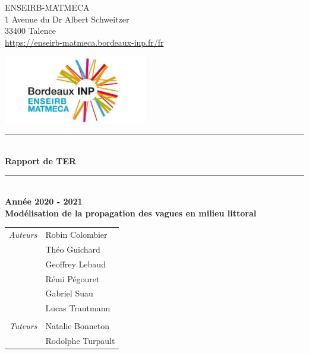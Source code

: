 \documentclass[
a4paper,
11pt,
titlepage,
]{article}
\begin{document}
\thispagestyle{empty}
\begin{titlepage}
	
  \begin{multicols}{2}
    \noindent ENSEIRB-MATMECA\\
    1 Avenue du Dr Albert Schweitzer\\
    33400 Talence\\
    \url{https://enseirb-matmeca.bordeaux-inp.fr/fr}
    \begin{flushright}
      \includegraphics[height=3cm]{logo_enseirb_matmeca.png}
    \end{flushright}
  \end{multicols}
  
  \begin{center}
    \rule{\linewidth}{0.5mm}\\[0.5cm]
    {\Large \textbf{Rapport de TER}}\\[0.3cm]
    \rule{\linewidth}{0.5mm}\\[1.5cm]
    
    \textbf{Année 2020 - 2021}\\[1.5cm]	
    
    \textbf{Modélisation de la propagation des vagues en milieu littoral}\\[3cm]
    
    \begin{tabular}{rl}
      {\it Auteurs} & Robin {\sc Colombier}\\
                    & Théo {\sc Guichard}\\
                    & Geoffrey {\sc Lebaud}\\
                    & Rémi {\sc Pégouret}\\
                    & Gabriel {\sc Suau}\\
                    & Lucas {\sc Trautmann}\\
                    &\\
      {\it Tuteurs} & Natalie {\sc Bonneton}\\
                    & Rodolphe {\sc Turpault}\\
    \end{tabular}\\[2cm]
  \end{center}
\end{titlepage}
\end{document}
